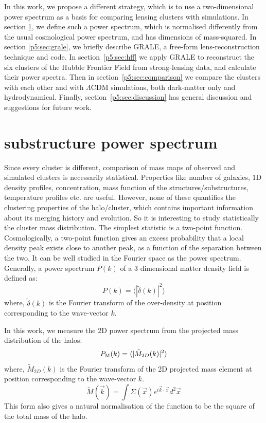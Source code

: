 \documentclass[
  11pt,
  twoside,
  openright,
  titlepage,
  headings=optiontoheadandtoc
]{scrbook}
\begin{document}
In this work, we propose a different strategy, which is to use a
two-dimensional power spectrum as a basis for comparing lensing
clusters with simulations.  In section \ref{p5:sec:pk}, we define such a
power spectrum, which is normalised differently from the usual
cosmological power spectrum, and has dimensions of mass-squared.  In
section \ref{p5:sec:grale}, we briefly describe GRALE, a
free-form lens-reconstruction technique and code.  In
section~\ref{p5:sec:hff} we apply GRALE to reconstruct the six clusters
of the Hubble Frontier Field from strong-lensing data, and calculate
their power spectra.  Then in section~\ref{p5:sec:comparison} we compare
the clusters with each other and with $\Lambda$CDM simulations, both
dark-matter only and hydrodynamical.  Finally,
section~\ref{p5:sec:discussion} has general discussion and suggestions
for future work.


\section{substructure power spectrum}\label{p5:sec:pk}

Since every cluster is different, comparison of mass maps of observed and simulated clusters is necessarily statistical.  Properties like number of galaxies, 1D density profiles,
concentration, mass function of the structures/substructures, temperature profiles etc.
are useful. However, none of these quantifies the clustering properties of the halo/cluster,
which contains important information about its merging history and evolution.
So it is interesting to study statistically the cluster mass distribution.
The simplest statistic is a two-point function.
Cosmologically, a two-point function gives an excess probability that a local density peak
exists close to another peak, as a function of the separation between the two. It can be well studied
in the Fourier space as the power spectrum. Generally, a power spectrum
$P(k)$ of a 3 dimensional matter density field is defined as:
\begin{equation}
    P(k) = \langle|\tilde{\delta}(k)|^2\rangle
    \label{p5:eqn:pkreal}
\end{equation}
where, $\tilde{\delta}(k)$ is the Fourier transform of the over-density at position corresponding
to the wave-vector $k$.

In this work, we measure the 2D
power spectrum from the projected mass distribution of the halos:
\begin{equation}
    P_{\rm M}(k) = \langle|\tilde{M}_{2D}(k)|^2\rangle
    \label{p5:eqn:pkour}
\end{equation}
where, $\tilde{M}_{2D}(k)$ is the Fourier transform of the 2D projected mass element at position
corresponding to the wave-vector $k$.
\begin{equation}
\tilde M(\vec{k}) = \int \Sigma(\vec{x}) e^{i\vec{k}\cdot\vec{x}} d^2\vec{x}
\end{equation}
This form also gives a natural normalisation of the function
to be the square of the total mass of the halo.
\end{document}

